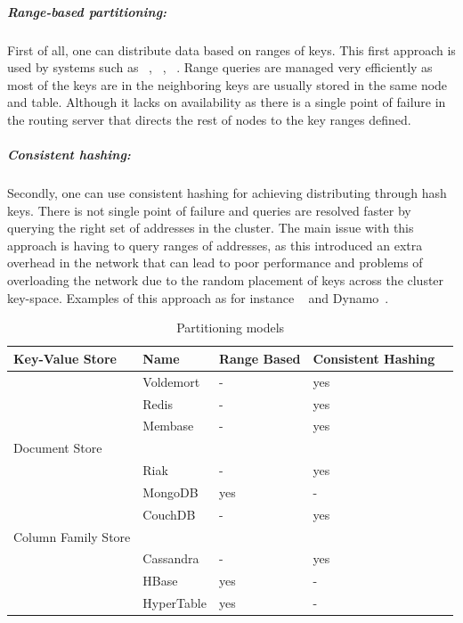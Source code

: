 	\subparagraph{Range-based partitioning:}
	First of all, one can distribute data based on ranges of keys. This first approach is used by systems such as ~\cite{HBase}, ~\cite{Mongodb}, ~\cite{Hypertable}. Range queries are managed very efficiently as most of the keys are in the neighboring keys are usually stored in the same node  and table. Although it lacks on availability as there is a single point of failure in the routing server that directs the rest of nodes to the key ranges defined.
		
	\subparagraph{Consistent hashing:}
	Secondly, one can use consistent hashing for achieving distributing through hash keys. There is not single point of failure and queries are resolved faster by querying the right set of addresses in the cluster. The main issue with this approach is having to query ranges of addresses, as this introduced an extra overhead in the network that can lead to poor performance and problems of overloading the network due to the random placement of keys across the cluster key-space. Examples of this approach as for instance ~\cite{Lakshman:2010} and Dynamo~\cite{DeCandia:2007}.
	
\begin{table}[b]
		\begin{center}
    			\begin{tabular}{ | p{5cm} | l | l | l | l |}
   			\hline
			Key-Value Store & Name & Range Based & Consistent Hashing \\ \hline   		
			 & Voldemort & - & yes \\ \hline
			 & Redis & - & yes \\ \hline
			 & Membase & - & yes \\ \hline
			
			Document Store &  &  &  \\ \hline
			 & Riak & - & yes \\ \hline			
			 & MongoDB & yes & - \\ \hline
			 & CouchDB & - & yes \\ \hline
			Column Family Store &  & \\ \hline
			 & Cassandra & - & yes \\ \hline
			 & HBase & yes & - \\ \hline
			 & HyperTable & yes & - \\ \hline
    			\end{tabular}
		\end{center}
		\caption{Partitioning models}
		\label{table:partitioning}
		\end{table}	
	
